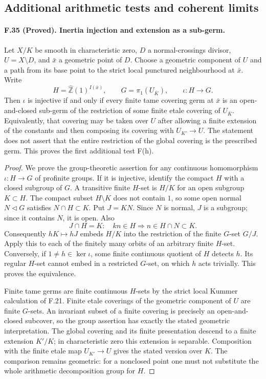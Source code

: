 \subsection{Additional arithmetic tests and coherent limits}

\paragraph{F.35 (Proved). Inertia injection and extension as a sub-germ.}
Let $X/K$ be smooth in characteristic zero, $D$ a normal-crossings divisor,
$U=X\setminus D$, and $\bar x$ a geometric point of $D$. Choose a geometric
component of $U$ and a path from its base point to the strict local
punctured neighbourhood at $\bar x$. Write
\[
 H=\widehat{\mathbb Z}(1)^{I(\bar x)},\qquad
 G=\pi_1(U_{\overline K}),\qquad \iota:H\longrightarrow G.
\]
Then $\iota$ is injective if and only if every finite tame covering germ
at $\bar x$ is an open-and-closed sub-germ of the restriction of some
finite etale covering of $U_{\overline K}$. Equivalently, that covering
may be taken over $U$ after allowing a finite extension of the constants
and then composing its covering with $U_{K'}\to U$. The statement does
not assert that the entire restriction of the global covering is the
prescribed germ. This proves the first additional test F(h).

\begin{proof}
We prove the group-theoretic assertion for any continuous homomorphism
$\iota:H\to G$ of profinite groups. If it is injective, identify the compact
$H$ with a closed subgroup of $G$. A transitive finite $H$-set is $H/K$
for an open subgroup $K\subset H$. The compact subset $H\setminus K$
does not contain $1$, so some open normal $N\lhd G$ satisfies
$N\cap H\subset K$. Put $J=KN$. Since $N$ is normal, $J$ is a subgroup;
since it contains $N$, it is open. Also
\[
 J\cap H=K:
 \quad kn\in H\Longrightarrow n\in H\cap N\subset K.
\]
Consequently $hK\mapsto hJ$ embeds $H/K$ into the restriction of the
finite $G$-set $G/J$. Apply this to each of the finitely many orbits of
an arbitrary finite $H$-set. Conversely, if $1\ne h\in\ker\iota$, some
finite continuous quotient of $H$ detects $h$. Its regular $H$-set
cannot embed in a restricted $G$-set, on which $h$ acts trivially.
This proves the equivalence.

Finite tame germs are finite continuous $H$-sets by the strict local
Kummer calculation of F.21. Finite etale coverings of the geometric
component of $U$ are finite $G$-sets. An invariant subset of a finite
covering is precisely an open-and-closed subcover, so the group assertion
has exactly the stated geometric interpretation. The global covering and its finite presentation descend to a finite
extension $K'/K$; in characteristic
zero this extension is separable. Composition with the finite etale map
$U_{K'}\to U$ gives the stated version over $K$. The comparison remains
geometric: for a nonclosed point one must not substitute the whole
arithmetic decomposition group for $H$.
\end{proof}

